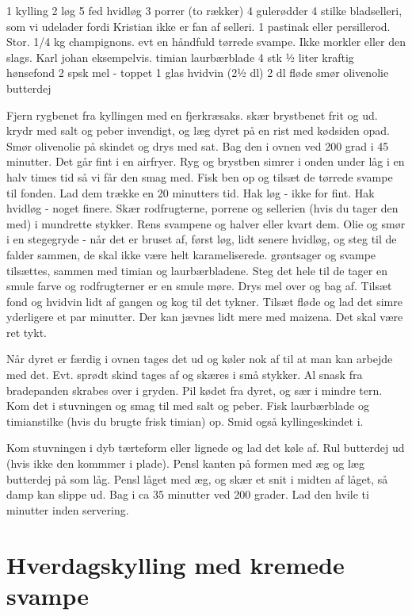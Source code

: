 \documentclass[
]{book}
\begin{document}
1 kylling
2 løg
5 fed hvidløg
3 porrer (to rækker)
4 gulerødder
4 stilke bladselleri, som vi udelader fordi Kristian ikke er fan af selleri.
1 pastinak eller persillerod. Stor.
1/4 kg champignons.
evt en håndfuld tørrede svampe. Ikke morkler eller den slags. Karl johan eksempelvis.
timian
laurbærblade 4 stk
½ liter kraftig hønsefond
2 spsk mel - toppet
1 glas hvidvin (2½ dl)
2 dl fløde
smør
olivenolie
butterdej

Fjern rygbenet fra kyllingen med en fjerkræsaks. skær brystbenet frit og ud.
krydr med salt og peber invendigt, og læg dyret på en rist med kødsiden opad.
Smør olivenolie på skindet og drys med sat. Bag den i ovnen ved 200 grad i
45 minutter. Det går fint i en airfryer.
Ryg og brystben simrer i onden under låg i en halv times tid så vi får den
smag med. Fisk ben op og tilsæt de tørrede svampe til fonden. Lad dem trække
en 20 minutters tid.
Hak løg - ikke for fint. Hak hvidløg - noget finere. Skær rodfrugterne, porrene
og sellerien (hvis du tager den med) i mundrette stykker. Rens svampene og
halver eller kvart dem.
Olie og smør i en stegegryde - når det er bruset af, først løg, lidt senere
hvidløg, og steg til de falder sammen, de skal ikke være helt karameliserede.
grøntsager og svampe tilsættes, sammen med timian og laurbærbladene. Steg det hele
til de tager en smule farve og rodfrugterner er en smule møre. Drys mel over
og bag af. Tilsæt fond og hvidvin lidt af gangen og kog til det tykner.
Tilsæt fløde og lad det simre yderligere et par minutter. Der kan jævnes lidt
mere med maizena. Det skal være ret tykt.

Når dyret er færdig i ovnen tages det ud og køler nok af til at man kan arbejde
med det. Evt. sprødt skind tages af og skæres i små stykker.
Al snask fra bradepanden skrabes over i gryden.
Pil kødet fra dyret, og sær i mindre tern. Kom det i stuvningen og smag til med
salt og peber. Fisk laurbærblade og timianstilke (hvis du brugte frisk timian)
op. Smid også kyllingeskindet i.

Kom stuvningen i dyb tærteform eller lignede og lad det køle af.
Rul butterdej ud (hvis ikke den kommmer i plade). Pensl kanten på formen med æg
og læg butterdej på som låg. Pensl låget med æg, og skær et snit i midten af
låget, så damp kan slippe ud. Bag i ca 35 minutter ved 200 grader. Lad
den hvile ti minutter inden servering.

\hypertarget{hverdagskylling-med-kremede-svampe}{%
\section{Hverdagskylling med kremede svampe}\label{hverdagskylling-med-kremede-svampe}}
\end{document}
